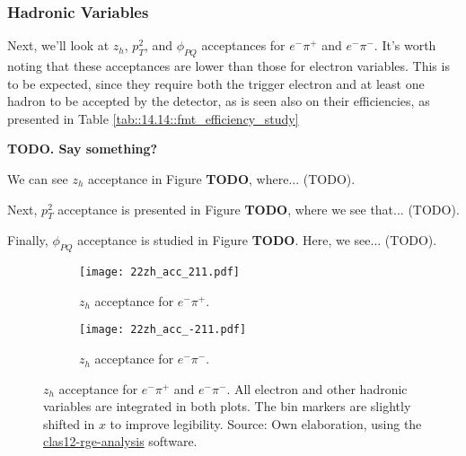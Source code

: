 \subsubsection{Hadronic Variables}
\label{14.22::hadronic_variables}
    Next, we'll look at $z_h$, $p_T^2$, and $\phi_{PQ}$ acceptances for $e^-\pi^+$ and $e^-\pi^-$.
    It's worth noting that these acceptances are lower than those for electron variables.
    This is to be expected, since they require both the trigger electron and at least one hadron to be accepted by the detector, as is seen also on their efficiencies, as presented in Table \ref{tab::14.14::fmt_efficiency_study}

    \textbf{TODO. Say something?}

    We can see $z_h$ acceptance in Figure \textbf{TODO}, where... (TODO).

    Next, $p_T^2$ acceptance is presented in Figure \textbf{TODO}, where we see that... (TODO).

    Finally, $\phi_{PQ}$ acceptance is studied in Figure \textbf{TODO}.
    Here, we see... (TODO).

    \begin{figure}
        \centering
        \begin{subfigure}[b]{0.49\textwidth}
            \centering
            \texttt{[image: 22zh\_acc\_211.pdf]}
            \caption{$z_h$ acceptance for $e^-\pi^+$.}
            \label{fig::14.22::zh_acc_211}
        \end{subfigure}
        \hfill
        \begin{subfigure}[b]{0.49\textwidth}
            \centering
            \texttt{[image: 22zh\_acc\_-211.pdf]}
            \caption{$z_h$ acceptance for $e^-\pi^-$.}
            \label{fig::14.22::zh_acc_-211}
        \end{subfigure}
        \caption[$z_h$ acceptance.]{$z_h$ acceptance for $e^-\pi^+$ and $e^-\pi^-$.
        All electron and other hadronic variables are integrated in both plots.
        The bin markers are slightly shifted in $x$ to improve legibility.
        Source: Own elaboration, using the \href{https://github.com/bleaktwig/clas12-rge-analysis}{clas12-rge-analysis} software.}
        \label{fig::14.22::zh_acc}
    \end{figure}

